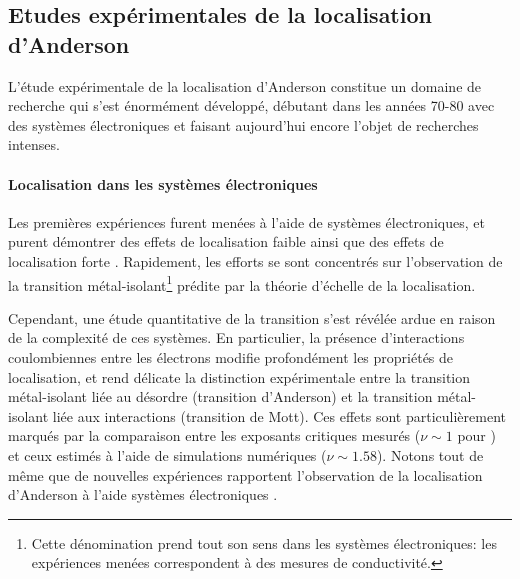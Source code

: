 \subsection{Etudes expérimentales de la localisation d'Anderson}
L'étude expérimentale de la localisation d'Anderson constitue un domaine de recherche qui s'est énormément développé, débutant dans les années 70-80 avec des systèmes électroniques et faisant aujourd'hui encore l'objet de recherches intenses.

\paragraph*{Localisation dans les systèmes électroniques}
Les premières expériences furent menées à l'aide de systèmes électroniques, et purent démontrer des effets de localisation faible ainsi que des effets de localisation forte \citep{mott1979electronic}\citep{paalanen1983critical}. Rapidement, les efforts se sont concentrés sur l'observation de la transition métal-isolant\footnote{Cette dénomination prend tout son sens dans les systèmes électroniques: les expériences menées correspondent à des mesures de conductivité.} prédite par la théorie d'échelle de la localisation. 

Cependant, une étude quantitative de la transition s'est révélée ardue en raison de la complexité de ces systèmes. En particulier, la présence d'interactions coulombiennes entre les électrons modifie profondément les propriétés de localisation, et rend délicate la distinction expérimentale entre la transition métal-isolant liée au désordre (transition d'Anderson) et la transition métal-isolant liée aux interactions (transition de Mott). Ces effets sont particulièrement marqués par la comparaison entre les exposants critiques mesurés ($\nu\sim 1$ pour \citep{shlimak1996determination}) et ceux estimés à l'aide de simulations numériques ($\nu\sim1.58$). Notons tout de même que de nouvelles expériences rapportent l'observation de la localisation d'Anderson à l'aide systèmes électroniques \citep{siegrist2011disorder}\citep{ying2016anderson}.

